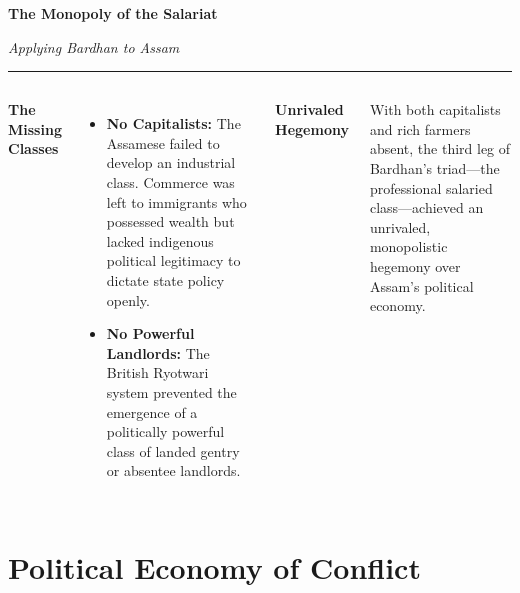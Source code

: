 \documentclass[aspectratio=169, 10pt]{beamer}
\newcommand{\slidetitlesub}[2]{%
  \vspace{-4pt}%
  {\usebeamerfont{frametitle}\Large\color{ink}\textbf{#1}}%
  \par\vspace{1pt}%
  {\small\color{slate}\textit{#2}}%
  \par\vspace{2pt}%
  {\color{clay}\rule{40pt}{2pt}}%
  \par\vspace{8pt}%
}
\newcommand{\infobox}[2]{%
  \begin{minipage}{\textwidth}
    {\bfseries\color{deepgreen}#1}\par\vspace{3pt}%
    \color{ink}#2
  \end{minipage}\par
}
\begin{document}
\begin{frame}
\slidetitlesub{The Monopoly of the Salariat}{Applying Bardhan to Assam}

\begin{columns}[T]
\textbf{\color{rust}The Missing Classes}
\begin{itemize}
  \item \textbf{No Capitalists:} The Assamese failed to develop an industrial class. Commerce was left to immigrants who possessed wealth but lacked indigenous political legitimacy to dictate state policy openly.
  \item \textbf{No Powerful Landlords:} The British Ryotwari system prevented the emergence of a politically powerful class of landed gentry or absentee landlords.
\end{itemize}

\infobox{Unrivaled Hegemony}{%
  With both capitalists and rich farmers absent, the third leg of Bardhan's triad—the professional salaried class—achieved an unrivaled, monopolistic hegemony over Assam's political economy. 
}
\end{columns}

\vspace{10pt}
\centering
{}
\end{frame}

\section{Political Economy of Conflict}
\end{document}
